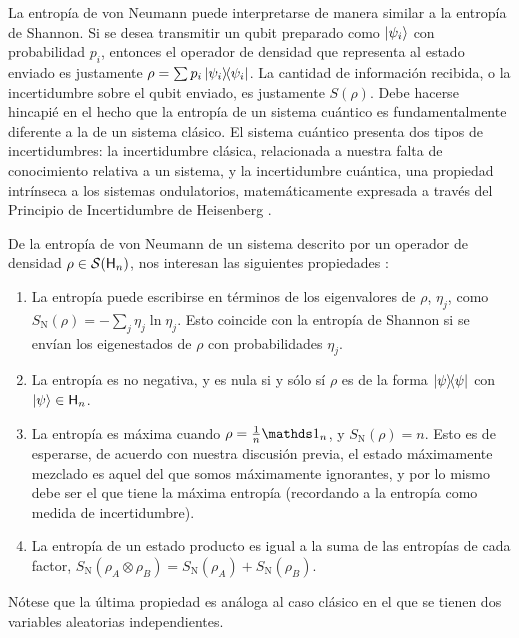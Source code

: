 La entropía de von Neumann puede interpretarse de manera similar a la entropía de Shannon. Si se desea transmitir un qubit preparado como $\ket{\psi_{i}}$ con probabilidad $p_{i}$, entonces el operador de densidad que representa al estado enviado es justamente $\rho=\sum p_{i}\dyad{\psi_{i}}$. La cantidad de información recibida, o la incertidumbre sobre el qubit enviado, es justamente $S(\rho)$. Debe hacerse hincapié en el hecho que la entropía de un sistema cuántico es fundamentalmente diferente a la de un sistema clásico. El sistema cuántico presenta dos tipos de incertidumbres: la incertidumbre clásica, relacionada a nuestra falta de conocimiento relativa a un sistema, y la incertidumbre cuántica, una propiedad intrínseca a los sistemas ondulatorios, matemáticamente expresada a través del Principio de Incertidumbre de Heisenberg \cite{Wilde}.


De la entropía de von Neumann de un sistema descrito por un operador de densidad $\rho\in\mathcal{S}({\sf H}_{n})$, nos interesan las siguientes propiedades \cite{Chuang}:
\begin{enumerate}
    \item La entropía puede escribirse en términos de los eigenvalores de $\rho$, $\eta_{j}$, como $S_{\text{N}}(\rho)=-\sum_{j}\eta_{j}\ln{\eta_{j}}$. Esto coincide con la entropía de Shannon si se envían los eigenestados de $\rho$ con probabilidades $\eta_{j}$.
    \item La entropía es no negativa, y es nula si y sólo sí $\rho$ es de la forma $\dyad{\psi}$ con $\ket{\psi}\in{\sf H}_{n}$.
    \item La entropía es máxima cuando $\rho=\frac{1}{n}\Id_{n}$, y $S_{\text{N}}(\rho)=n$. Esto es de esperarse, de acuerdo con nuestra discusión previa, el estado máximamente mezclado es aquel del que somos máximamente ignorantes, y por lo mismo debe ser el que tiene la máxima entropía (recordando a la entropía como medida de incertidumbre).
    \item La entropía de un estado producto es igual a la suma de las entropías de cada factor, $S_{\text{N}}(\rho_{A}\otimes\rho_{B})=S_{\text{N}}(\rho_{A})+S_{\text{N}}(\rho_{B})$.
\end{enumerate}
Nótese que la última propiedad es análoga al caso clásico en el que se tienen dos variables aleatorias independientes.